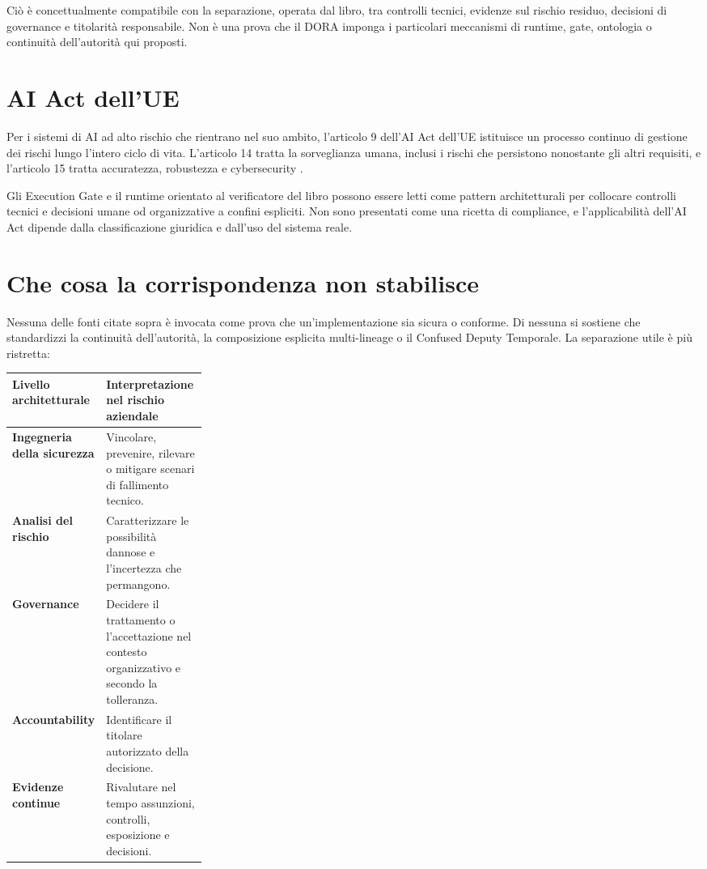 \documentclass[10pt,oneside,openany]{book}
\begin{document}
Ciò è concettualmente compatibile con la separazione, operata dal libro, tra controlli tecnici, evidenze sul rischio residuo, decisioni di governance e titolarità responsabile. Non è una prova che il DORA imponga i particolari meccanismi di runtime, gate, ontologia o continuità dell'autorità qui proposti.

\section{AI Act dell'UE}
Per i sistemi di AI ad alto rischio che rientrano nel suo ambito, l'articolo 9 dell'AI Act dell'UE istituisce un processo continuo di gestione dei rischi lungo l'intero ciclo di vita. L'articolo 14 tratta la sorveglianza umana, inclusi i rischi che persistono nonostante gli altri requisiti, e l'articolo 15 tratta accuratezza, robustezza e cybersecurity \cite{aiact2024}.

Gli Execution Gate e il runtime orientato al verificatore del libro possono essere letti come pattern architetturali per collocare controlli tecnici e decisioni umane od organizzative a confini espliciti. Non sono presentati come una ricetta di compliance, e l'applicabilità dell'AI Act dipende dalla classificazione giuridica e dall'uso del sistema reale.

\section{Che cosa la corrispondenza non stabilisce}
Nessuna delle fonti citate sopra è invocata come prova che un'implementazione sia sicura o conforme. Di nessuna si sostiene che standardizzi la continuità dell'autorità, la composizione esplicita multi-lineage o il Confused Deputy Temporale. La separazione utile è più ristretta:

\begin{center}
\small
\begin{tabularx}{0.95\linewidth}{>{\bfseries}p{0.28\linewidth} Y}
\toprule
Livello architetturale & Interpretazione nel rischio aziendale \\
\midrule
Ingegneria della sicurezza & Vincolare, prevenire, rilevare o mitigare scenari di fallimento tecnico. \\
Analisi del rischio & Caratterizzare le possibilità dannose e l'incertezza che permangono. \\
Governance & Decidere il trattamento o l'accettazione nel contesto organizzativo e secondo la tolleranza. \\
Accountability & Identificare il titolare autorizzato della decisione. \\
Evidenze continue & Rivalutare nel tempo assunzioni, controlli, esposizione e decisioni. \\
\bottomrule
\end{tabularx}
\end{center}
\end{document}
